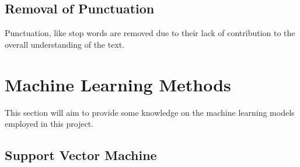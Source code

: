 \documentclass[11pt, a4paper]{article}
\begin{document}
\subsection{Removal of Punctuation}

Punctuation, like stop words are removed due to their lack of contribution to the overall understanding of the text.  

\newpage
\section{Machine Learning Methods}

This section will aim to provide some knowledge on the machine learning models employed in this project. 

\subsection{Support Vector Machine}
\end{document}
